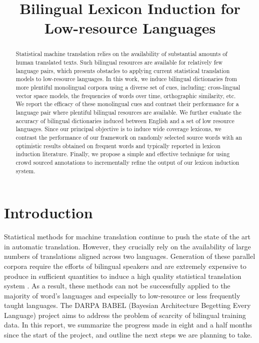 \documentclass{article}
\title{Bilingual Lexicon Induction for Low-resource Languages}
\newcommand{\mtodo}[1]{}
\begin{document}
\maketitle

\begin{abstract}

Statistical machine translation relies on the availability of substantial amounts of human translated texts. Such bilingual resources are available for relatively few language pairs, which presents obstacles to applying current statistical translation models to low-resource languages. In this work, we induce bilingual dictionaries from more plentiful monolingual corpora using a diverse set of cues, including: cross-lingual vector space models, the frequencies of words over time, orthographic similarity, etc.  We report the efficacy of these monolingual cues and contrast their performance for a language pair where plentiful bilingual resources are available.  We further evaluate the accuracy of bilingual dictionaries induced between English and a set of low resource languages.  Since our principal objective is to induce wide coverage lexicons, we contrast the performance of our framework on randomly selected source words with an optimistic results obtained on frequent words and typically reported in lexicon induction literature.  Finally, we propose a simple and effective technique for using crowd sourced annotations to incrementally refine the output of our lexicon induction system.%
\end{abstract}

\section{Introduction}

Statistical methods for machine translation continue to push the state of the art in automatic translation. However, they crucially rely on the availability of large numbers of translations aligned across two languages. Generation of these parallel corpora require the efforts of bilingual speakers and are extremely expensive to produce in sufficient quantities to induce a high quality statistical translation system \cite{Germann:2001, Oard:2003}.  As a result, these methods can not be successfully applied to the majority of word's languages and especially to low-resource or less frequently taught languages.  The DARPA BABEL (Bayesian Architecture Begetting Every Language) project aims to address the problem of scarcity of bilingual training data.  In this report, we summarize the progress made in eight and a half months since the start of the project, and outline the next steps we are planning to take.\\
\end{document}

